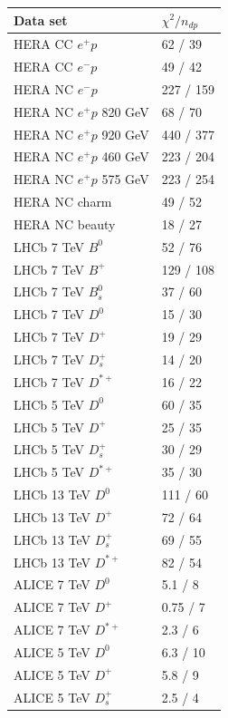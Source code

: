\documentclass[12pt]{article}
\begin{document}
\begin{table}
\renewcommand*{\arraystretch}{1.12}
    \centering
\begin{tabular}{ll}
    Data set & $\chi^2/n_{dp}$ \\
    \hline
    HERA CC $e^{+}p$ & 62 / 39  \\ 
    HERA CC $e^{-}p$ & 49 / 42  \\ 
    HERA NC $e^{-}p$ & 227 / 159  \\ 
    HERA NC $e^{+}p$ 820 GeV & 68 / 70  \\ 
    HERA NC $e^{+}p$ 920 GeV & 440 / 377  \\ 
    HERA NC $e^{+}p$ 460 GeV & 223 / 204  \\ 
    HERA NC $e^{+}p$ 575 GeV & 223 / 254  \\ 
    HERA NC charm & 49 / 52  \\ 
    HERA NC beauty & 18 / 27  \\ 
    LHCb 7 TeV $B^0$ & 52 / 76  \\ 
    LHCb 7 TeV $B^{+}$ & 129 / 108  \\ 
    LHCb 7 TeV $B^{0}_s$ & 37 / 60  \\ 
    LHCb 7 TeV $D^0$ & 15 / 30  \\ 
    LHCb 7 TeV $D^{+}$ & 19 / 29  \\ 
    LHCb 7 TeV $D^{+}_{s}$ & 14 / 20  \\ 
    LHCb 7 TeV $D^{*+}$ & 16 / 22  \\ 
    LHCb 5 TeV $D^0$ & 60 / 35  \\ 
    LHCb 5 TeV $D^{+}$ & 25 / 35  \\ 
    LHCb 5 TeV $D^{+}_{s}$ & 30 / 29  \\ 
    LHCb 5 TeV $D^{*+}$ & 35 / 30  \\ 
    LHCb 13 TeV $D^0$ & 111 / 60  \\ 
    LHCb 13 TeV $D^{+}$ & 72 / 64  \\ 
    LHCb 13 TeV $D^{+}_{s}$ & 69 / 55  \\ 
    LHCb 13 TeV $D^{*+}$ & 82 / 54  \\ 
    ALICE 7 TeV $D^0$ & 5.1 / 8  \\ 
    ALICE 7 TeV $D^{+}$ & 0.75 / 7  \\ 
    ALICE 7 TeV $D^{*+}$ & 2.3 / 6  \\ 
    ALICE 5 TeV $D^0$ & 6.3 / 10  \\ 
    ALICE 5 TeV $D^{+}$ & 5.8 / 9  \\ 
    ALICE 5 TeV $D^{+}_{s}$ & 2.5 / 4  \\ 

\end{tabular}
\end{table}
\end{document}
